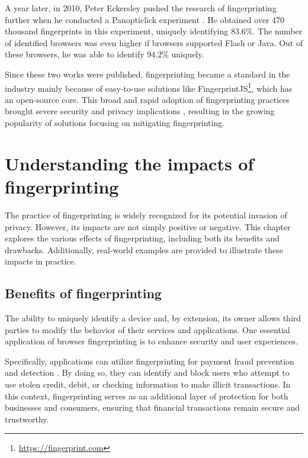 A year later, in 2010, Peter Eckersley pushed the research of fingerprinting further when he conducted a Panopticlick experiment \cite{EckersleyHowUnique}. He obtained over 470 thousand fingerprints in this experiment, uniquely identifying 83.6\%. The number of identified browsers was even higher if browsers supported Flash or Java. Out of these browsers, he was able to identify 94.2\% uniquely.

Since these two works were published, fingerprinting became a standard in the industry mainly because of easy-to-use solutions like FingerprintJS\footnote{\url{https://fingerprint.com}}, which has an open-source core. This broad and rapid adoption of fingerprinting practices brought severe security and privacy implications \cite{WP224Fingerprinting}, resulting in the growing popularity of solutions focusing on mitigating fingerprinting.

\section{Understanding the impacts of fingerprinting}
\label{UnderstandingFingerprinting}

The practice of fingerprinting is widely recognized for its potential invasion of privacy. However, its impacts are not simply positive or negative. This chapter explores the various effects of fingerprinting, including both its benefits and drawbacks. Additionally, real-world examples are provided to illustrate these impacts in practice.

\subsection{Benefits of fingerprinting}

The ability to uniquely identify a device and, by extension, its owner allows third parties to modify the behavior of their services and applications. One essential application of browser fingerprinting is to enhance security and user experiences.

Specifically, applications can utilize fingerprinting for payment fraud prevention and detection \cite{FingerprintJSUseCases}.  By doing so, they can identify and block users who attempt to use stolen credit, debit, or checking information to make illicit transactions. In this context, fingerprinting serves as an additional layer of protection for both businesses and consumers, ensuring that financial transactions remain secure and trustworthy.

